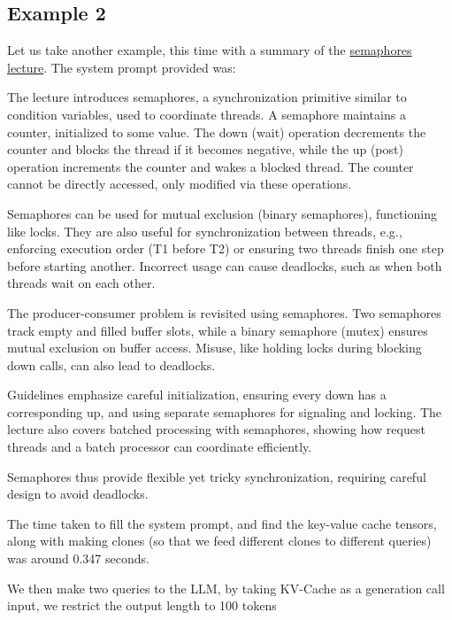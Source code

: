\subsection{Example 2}
Let us take another example, this time with a summary of the  \href{https://www.cse.iitb.ac.in/~mythili/os/iitb_slides/semaphores.pdf}{semaphores lecture}. The system prompt provided was:

\begin{tcolorbox}[colback=gray!10, colframe=gray!60!black, sharp corners, boxrule=0.5pt, left=4pt, right=4pt, top=4pt, bottom=4pt]
\small
The lecture introduces semaphores, a synchronization primitive similar to condition variables, used to coordinate threads. A semaphore maintains a counter, initialized to some value. The down (wait) operation decrements the counter and blocks the thread if it becomes negative, while the up (post) operation increments the counter and wakes a blocked thread. The counter cannot be directly accessed, only modified via these operations.

Semaphores can be used for mutual exclusion (binary semaphores), functioning like locks. They are also useful for synchronization between threads, e.g., enforcing execution order (T1 before T2) or ensuring two threads finish one step before starting another. Incorrect usage can cause deadlocks, such as when both threads wait on each other.

The producer-consumer problem is revisited using semaphores. Two semaphores track empty and filled buffer slots, while a binary semaphore (mutex) ensures mutual exclusion on buffer access. Misuse, like holding locks during blocking down calls, can also lead to deadlocks.

Guidelines emphasize careful initialization, ensuring every down has a corresponding up, and using separate semaphores for signaling and locking. The lecture also covers batched processing with semaphores, showing how request threads and a batch processor can coordinate efficiently.

Semaphores thus provide flexible yet tricky synchronization, requiring careful design to avoid deadlocks.
\end{tcolorbox}


The time taken to fill the system prompt, and find the key-value cache tensors, along with making clones (so that we feed different clones to different queries) was around 0.347 seconds.


We then make two queries to the LLM, by taking KV-Cache as a generation call input, we restrict the output length to 100 tokens


